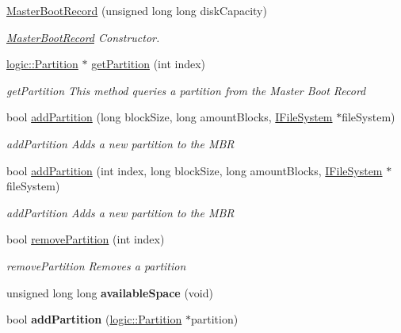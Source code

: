 \begin{DoxyCompactItemize}
\item 
\mbox{\hyperlink{classdisk_1_1_master_boot_record_ad037f4c38e76f64b7d06f8795531442c}{Master\+Boot\+Record}} (unsigned long long disk\+Capacity)
\begin{DoxyCompactList}\small\item\em \mbox{\hyperlink{classdisk_1_1_master_boot_record}{Master\+Boot\+Record}} Constructor. \end{DoxyCompactList}\item 
\mbox{\hyperlink{classlogic_1_1_partition}{logic\+::\+Partition}} $\ast$ \mbox{\hyperlink{classdisk_1_1_master_boot_record_aa6a157de631e76fd8f8a01526190ffe6}{get\+Partition}} (int index)
\begin{DoxyCompactList}\small\item\em get\+Partition This method queries a partition from the Master Boot Record \end{DoxyCompactList}\item 
bool \mbox{\hyperlink{classdisk_1_1_master_boot_record_ab1f46cc41735db1fcdd2aef912da29a4}{add\+Partition}} (long block\+Size, long amount\+Blocks, \mbox{\hyperlink{class_i_file_system}{I\+File\+System}} $\ast$file\+System)
\begin{DoxyCompactList}\small\item\em add\+Partition Adds a new partition to the M\+BR \end{DoxyCompactList}\item 
bool \mbox{\hyperlink{classdisk_1_1_master_boot_record_a901d6bfb4b860b739e204be4f6cc47a4}{add\+Partition}} (int index, long block\+Size, long amount\+Blocks, \mbox{\hyperlink{class_i_file_system}{I\+File\+System}} $\ast$file\+System)
\begin{DoxyCompactList}\small\item\em add\+Partition Adds a new partition to the M\+BR \end{DoxyCompactList}\item 
bool \mbox{\hyperlink{classdisk_1_1_master_boot_record_af155df4b9738c217678a8f875e679c50}{remove\+Partition}} (int index)
\begin{DoxyCompactList}\small\item\em remove\+Partition Removes a partition \end{DoxyCompactList}\item 
\mbox{\label{classdisk_1_1_master_boot_record_a87a82e1edd865a766f6cf73de147a9e1}} 
unsigned long long {\bfseries available\+Space} (void)
\item 
\mbox{\label{classdisk_1_1_master_boot_record_a2247447acf2ad887c9ef1effbd397fae}} 
bool {\bfseries add\+Partition} (\mbox{\hyperlink{classlogic_1_1_partition}{logic\+::\+Partition}} $\ast$partition)
\end{DoxyCompactItemize}
